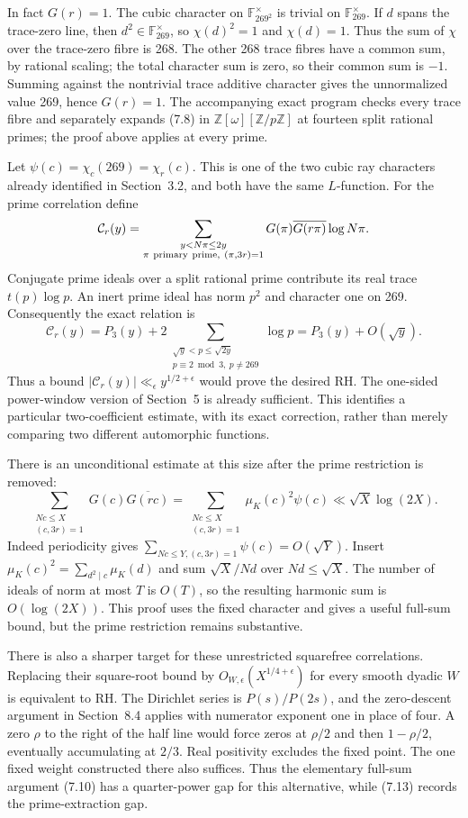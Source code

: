 \documentclass[11pt]{article}
\newcommand{\Z}{\mathbb Z}
\begin{document}
In fact $G(r)=1$. The cubic character on $\mathbb F_{269^2}^{\times}$ is trivial on $\mathbb F_{269}^{\times}$. If $d$ spans the trace-zero line, then $d^2\in\mathbb F_{269}^{\times}$, so $\chi(d)^2=1$ and $\chi(d)=1$. Thus the sum of $\chi$ over the trace-zero fibre is 268. The other 268 trace fibres have a common sum, by rational scaling; the total character sum is zero, so their common sum is $-1$. Summing against the nontrivial trace additive character gives the unnormalized value 269, hence $G(r)=1$. The accompanying exact program checks every trace fibre and separately expands (7.8) in $\Z[\omega][\Z/p\Z]$ at fourteen split rational primes; the proof above applies at every prime.

Let $\psi(c)=\chi_c(269)=\chi_r(c)$. This is one of the two cubic ray characters already identified in Section~3.2, and both have the same $L$-function. For the prime correlation define
\[
 \mathcal C_r(y)=\sum_{\substack{y<N\pi\le2y\\\pi\ {\rm primary\ prime},\ (\pi,3r)=1}}
              G(\pi)\overline{G(r\pi)}\log N\pi.
\]
Conjugate prime ideals over a split rational prime contribute its real trace $t(p)\log p$. An inert prime ideal has norm $p^2$ and character one on 269. Consequently the exact relation is
\[
 \mathcal C_r(y)=P_3(y)+
  2\sum_{\substack{\sqrt y<p\le\sqrt{2y}\\p\equiv2\bmod3,\ p\ne269}}\log p
       =P_3(y)+O(\sqrt y).
 \tag{7.9}
\]
Thus a bound $|\mathcal C_r(y)|\ll_\epsilon y^{1/2+\epsilon}$ would prove the desired RH. The one-sided power-window version of Section~5 is already sufficient. This identifies a particular two-coefficient estimate, with its exact correction, rather than merely comparing two different automorphic functions.

There is an unconditional estimate at this size after the prime restriction is removed:
\[
 \sum_{\substack{Nc\le X\\(c,3r)=1}}G(c)\overline{G(rc)}
  =\sum_{\substack{Nc\le X\\(c,3r)=1}}\mu_K(c)^2\psi(c)
  \ll\sqrt X\log(2X).
 \tag{7.10}
\]
Indeed periodicity gives $\sum_{Nc\le Y,(c,3r)=1}\psi(c)=O(\sqrt Y)$. Insert $\mu_K(c)^2=\sum_{d^2\mid c}\mu_K(d)$ and sum $\sqrt X/Nd$ over $Nd\le\sqrt X$. The number of ideals of norm at most $T$ is $O(T)$, so the resulting harmonic sum is $O(\log(2X))$. This proof uses the fixed character and gives a useful full-sum bound, but the prime restriction remains substantive.

There is also a sharper target for these unrestricted squarefree correlations. Replacing their square-root bound by $O_{W,\epsilon}(X^{1/4+\epsilon})$ for every smooth dyadic $W$ is equivalent to RH. The Dirichlet series is $P(s)/P(2s)$, and the zero-descent argument in Section~8.4 applies with numerator exponent one in place of four. A zero $\rho$ to the right of the half line would force zeros at $\rho/2$ and then $1-\rho/2$, eventually accumulating at $2/3$. Real positivity excludes the fixed point. The one fixed weight constructed there also suffices. Thus the elementary full-sum argument (7.10) has a quarter-power gap for this alternative, while (7.13) records the prime-extraction gap.
\end{document}
